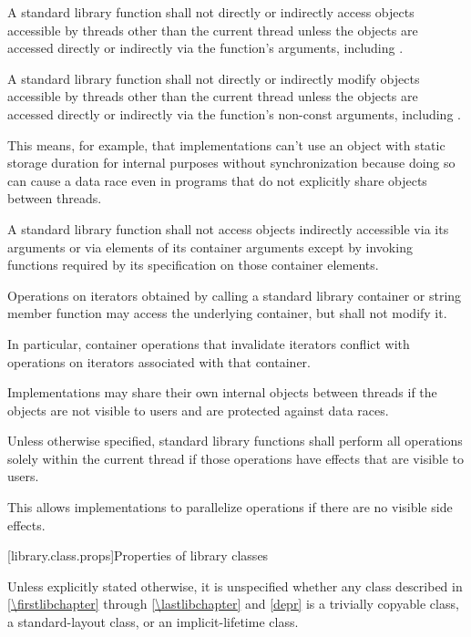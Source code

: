 \pnum
A \Cpp{} standard library function shall not directly or indirectly access
objects accessible by threads other than the current thread
unless the objects are accessed directly or indirectly via the function's arguments,
including .

\pnum
A \Cpp{} standard library function shall not directly or indirectly modify
objects accessible by threads other than the current thread
unless the objects are accessed directly or indirectly via the function's non-const
arguments, including .

\pnum
\begin{note}
This means, for example, that implementations can't use an object with static storage duration for
internal purposes without synchronization because doing so can cause a data race even in
programs that do not explicitly share objects between threads.
\end{note}

\pnum
A \Cpp{} standard library function shall not access objects indirectly accessible via its
arguments or via elements of its container arguments except by invoking functions
required by its specification on those container elements.

\pnum
Operations on iterators obtained by calling a standard library container or string
member function may access the underlying container, but shall not modify it.
\begin{note}
In particular, container operations that invalidate iterators conflict
with operations on iterators associated with that container.
\end{note}

\pnum
Implementations may share their own internal objects between threads if the objects are
not visible to users and are protected against data races.

\pnum
Unless otherwise specified, \Cpp{} standard library functions shall perform all operations
solely within the current thread if those operations have effects that are
visible to users.

\pnum
\begin{note}
This allows implementations to parallelize operations if there are no visible
%
side effects.
\end{note}

[library.class.props]{Properties of library classes}

\pnum
Unless explicitly stated otherwise, it is unspecified whether any class
described in \ref{\firstlibchapter} through \ref{\lastlibchapter} and
\ref{depr} is a trivially copyable class, a standard-layout class, or an
implicit-lifetime class.

